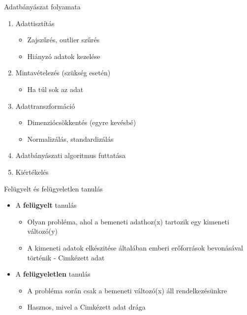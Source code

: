 \documentclass[bigger]{beamer}
\begin{document}
\begin{frame}{Adatbányászat folyamata}
    \begin{enumerate}
        \item Adattisztítás
            \begin{itemize}
                \item Zajszűrés, outlier szűrés
                \item Hiányzó adatok kezelése
            \end{itemize}
        \item Mintavételezés (szükség esetén)
            \begin{itemize}
                \item Ha túl sok az adat 
            \end{itemize}
        \item Adattranszformáció
            \begin{itemize}
                \item Dimenziócsökkentés (egyre kevésbé)
                \item Normalizálás, standardizálás
            \end{itemize}
        \item Adatbányászati algoritmus futtatása
        \item Kiértékelés
    \end{enumerate}
\end{frame}


\begin{frame}{Felügyelt és felügyeletlen tanulás}
\begin{itemize}
	\item A \textbf{felügyelt} tanulás
	\begin{itemize}
		\item Olyan probléma, ahol a bemeneti adathoz(x) tartozik egy kimeneti változó(y)
		\item A kimeneti adatok elkészitése általában emberi erőforrások bevonásával történik - Cimkézett adat		
	\end{itemize}
	\item A \textbf{felügyeletlen} tanulás
	\begin{itemize}
		\item A probléma során csak a bemeneti változó(x) áll rendelkezésünkre
		\item Hasznos, mivel a Cimkézett adat drága
	\end{itemize}
\end{itemize}
\end{frame}
\end{document}

